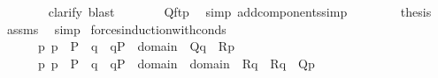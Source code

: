 \begin{isabellebody}
\ \ \ \ \ \ \isamarkupfalse%
\ {\isacharparenleft}{\kern0pt}clarify{\isacharparenright}{\kern0pt}\ {\isacharparenleft}{\kern0pt}blast{\isacharparenright}{\kern0pt}\isanewline
\ \ \ \ \isamarkupfalse%
\ \isamarkupfalse%
\ {\isachardoublequoteopen}Q{\isacharparenleft}{\kern0pt}ft{\isacharcomma}{\kern0pt}{\isasymtau}{\isacharcomma}{\kern0pt}{\isasymtheta}{\isacharcomma}{\kern0pt}p{\isacharparenright}{\kern0pt}{\isachardoublequoteclose}\ \isamarkupfalse%
\ {\isacharparenleft}{\kern0pt}simp\ add{\isacharcolon}{\kern0pt}components{\isacharunderscore}{\kern0pt}simp{\isacharparenright}{\kern0pt}\isanewline
\ \ \isacommand{{\isacharbraceright}{\kern0pt}}\isamarkupfalse%
\isanewline
\ \ \isamarkupfalse%
\ \isamarkupfalse%
\ {\isacharquery}{\kern0pt}thesis\ \isamarkupfalse%
\ assms\ \isamarkupfalse%
\ simp\isanewline
{}\isamarkupfalse%
%
\endisatagproof
{\isafoldproof}%
%
\isadelimproof
\isanewline
%
\endisadelimproof
\isanewline
{}\isamarkupfalse%
\ forces{\isacharunderscore}{\kern0pt}induction{\isacharunderscore}{\kern0pt}with{\isacharunderscore}{\kern0pt}conds{\isacharcolon}{\kern0pt}\isanewline
\ \ \isanewline
\ \ \ \ {\isachardoublequoteopen}{\isasymAnd}{\isasymtau}\ {\isasymtheta}\ p{\isachardot}{\kern0pt}\ p\ {\isasymin}\ P\ {\isasymLongrightarrow}\ {\isasymlbrakk}{\isasymAnd}q\ {\isasymsigma}{\isachardot}{\kern0pt}\ {\isasymlbrakk}q{\isasymin}P\ {\isacharsemicolon}{\kern0pt}\ {\isasymsigma}{\isasymin}domain{\isacharparenleft}{\kern0pt}{\isasymtheta}{\isacharparenright}{\kern0pt}{\isasymrbrakk}\ {\isasymLongrightarrow}\ Q{\isacharparenleft}{\kern0pt}q{\isacharcomma}{\kern0pt}{\isasymtau}{\isacharcomma}{\kern0pt}{\isasymsigma}{\isacharparenright}{\kern0pt}{\isasymrbrakk}\ {\isasymLongrightarrow}\ R{\isacharparenleft}{\kern0pt}p{\isacharcomma}{\kern0pt}{\isasymtau}{\isacharcomma}{\kern0pt}{\isasymtheta}{\isacharparenright}{\kern0pt}{\isachardoublequoteclose}\isanewline
\ \ \ \ {\isachardoublequoteopen}{\isasymAnd}{\isasymtau}\ {\isasymtheta}\ p{\isachardot}{\kern0pt}\ p\ {\isasymin}\ P\ {\isasymLongrightarrow}\ {\isasymlbrakk}{\isasymAnd}q\ {\isasymsigma}{\isachardot}{\kern0pt}\ {\isasymlbrakk}q{\isasymin}P\ {\isacharsemicolon}{\kern0pt}\ {\isasymsigma}{\isasymin}domain{\isacharparenleft}{\kern0pt}{\isasymtau}{\isacharparenright}{\kern0pt}\ {\isasymunion}\ domain{\isacharparenleft}{\kern0pt}{\isasymtheta}{\isacharparenright}{\kern0pt}{\isasymrbrakk}\ {\isasymLongrightarrow}\ R{\isacharparenleft}{\kern0pt}q{\isacharcomma}{\kern0pt}{\isasymsigma}{\isacharcomma}{\kern0pt}{\isasymtau}{\isacharparenright}{\kern0pt}\ {\isasymand}\ R{\isacharparenleft}{\kern0pt}q{\isacharcomma}{\kern0pt}{\isasymsigma}{\isacharcomma}{\kern0pt}{\isasymtheta}{\isacharparenright}{\kern0pt}{\isasymrbrakk}\ {\isasymLongrightarrow}\ Q{\isacharparenleft}{\kern0pt}p{\isacharcomma}{\kern0pt}{\isasymtau}{\isacharcomma}{\kern0pt}{\isasymtheta}{\isacharparenright}{\kern0pt}{\isachardoublequoteclose}\isanewline

\end{isabellebody}
